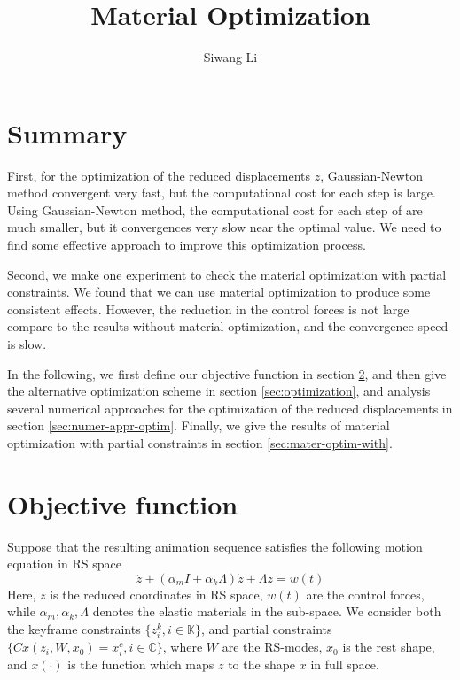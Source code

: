 \documentclass[9pt,twocolumn]{extarticle}
\author{Siwang Li}
\title{Material Optimization}
\begin{document}
\maketitle

\setlength{\parskip}{0.5ex}

\section{Summary}
First, for the optimization of the reduced displacements $z$, Gaussian-Newton
method convergent very fast, but the computational cost for each step is
large. Using Gaussian-Newton method, the computational cost for each step of are
much smaller, but it convergences very slow near the optimal value. We need to
find some effective approach to improve this optimization process.

Second, we make one experiment to check the material optimization with partial
constraints. We found that we can use material optimization to produce some
consistent effects. However, the reduction in the control forces is not large
compare to the results without material optimization, and the convergence speed
is slow.

In the following, we first define our objective function in section
\ref{sec:objective-function}, and then give the alternative optimization scheme
in section \ref{sec:optimization}, and analysis several numerical approaches for
the optimization of the reduced displacements in section
\ref{sec:numer-appr-optim}. Finally, we give the results of material
optimization with partial constraints in section \ref{sec:mater-optim-with}.

\section{Objective  function}\label{sec:objective-function}
Suppose that the resulting animation sequence satisfies the following motion
equation in RS space
\begin{equation} \label{motion_eq}
  \ddot{z} + (\alpha_mI+\alpha_k\Lambda)\dot{z}+\Lambda z = w(t)
\end{equation}
Here, $z$ is the reduced coordinates in RS space, $w(t)$ are the control forces,
while $\alpha_m,\alpha_k,\Lambda$ denotes the elastic materials in the
sub-space. We consider both the keyframe constraints $\{z_i^k,i\in
\mathbb{K}\}$, and partial constraints $\{Cx(z_i,W,x_0)=x_i^c,i\in
\mathbb{C}\}$, where $W$ are the RS-modes, $x_0$ is the rest shape, and
$x(\cdot)$ is the function which maps $z$ to the shape $x$ in full space.
\end{document}
